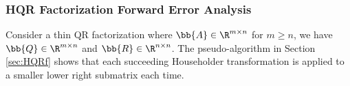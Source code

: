 \subsubsection{HQR Factorization Forward Error Analysis}

Consider a thin QR factorization where $\bb{A}\in\R^{m\times n}$ for $m\geq n$, we have $\bb{Q}\in\R^{m\times n}$ and $\bb{R}\in\R^{n\times n}$.
The pseudo-algorithm in Section \ref{sec:HQRf} shows that each succeeding Householder transformation is applied to a smaller lower right submatrix each time. \par

